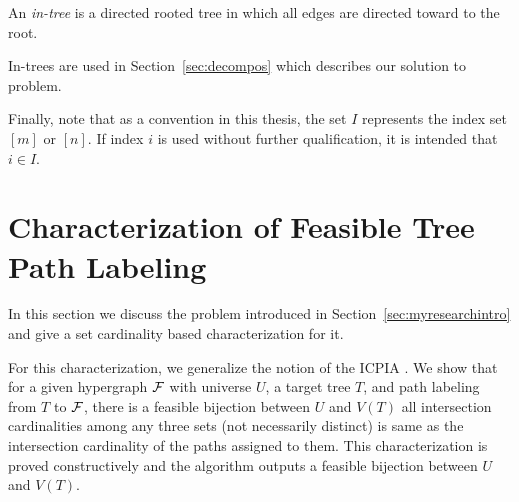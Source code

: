 

\begin{definition}[In-tree]
An {\em in-tree} is a directed rooted tree in which all edges are
directed toward to the root.  
\end{definition}
In-trees are used in Section~\ref{sec:decompos} which describes our
solution to \CFTPL problem.

Finally, note that as a convention in this thesis, the set $I$
represents the index set $[m]$ or $[n]$. If index $i$ is used without further
qualification, it is intended that $i \in I$.

\section[Characterization of FTPL]{Characterization of Feasible Tree
  Path Labeling}
\label{sec:feasible}

In this section we discuss the \FTPL problem introduced in
Section~\ref{sec:myresearchintro} and give a set cardinality based
characterization for it.


For this characterization, we generalize the notion of the ICPIA
\cite{nsnrs09}.  We show that for a given hypergraph ${\cal F}$ with
universe $U$, a target tree $T$, and path labeling from $T$ to ${\cal F}$, there
is a feasible bijection between $U$ and $V(T)$ \iff all intersection
cardinalities among any three sets (not necessarily distinct) is same
as the intersection cardinality of the paths assigned to them.  This
characterization is proved constructively and the algorithm outputs a
feasible bijection between $U$ and $V(T)$.

